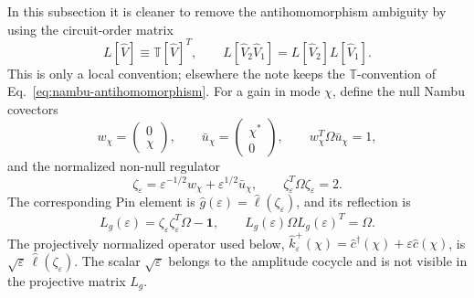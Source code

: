 \documentclass[aps,prb,onecolumn,nofootinbib,superscriptaddress]{revtex4-2}
\newcommand{\I}{\mathbf{1}}
\theoremstyle{plain}
\theoremstyle{definition}
\begin{document}
In this subsection it is cleaner to remove the antihomomorphism ambiguity by
using the circuit-order matrix
\begin{equation}
  L[\hat V]\equiv \mathbb T[\hat V]^T,
  \qquad
  L[\hat V_2\hat V_1]=L[\hat V_2]L[\hat V_1].
  \label{eq:circuit-order-L-convention}
\end{equation}
This is only a local convention; elsewhere the note keeps the
\(\mathbb T\)-convention of Eq.~\eqref{eq:nambu-antihomomorphism}.  For a
gain in mode \(\chi\), define the null Nambu covectors
\begin{equation}
  w_\chi=
  \begin{pmatrix}0\\ \chi\end{pmatrix},
  \qquad
  \bar u_\chi=
  \begin{pmatrix}\chi^*\\0\end{pmatrix},
  \qquad
  w_\chi^T\Omega \bar u_\chi=1,
  \label{eq:single-copy-null-gain-pair}
\end{equation}
and the normalized non-null regulator
\begin{equation}
  \zeta_\varepsilon
  =
  \varepsilon^{-1/2}w_\chi
  +
  \varepsilon^{1/2}\bar u_\chi,
  \qquad
  \zeta_\varepsilon^T\Omega\zeta_\varepsilon=2 .
  \label{eq:single-copy-gain-regulator-zeta}
\end{equation}
The corresponding Pin element is
\(\hat g(\varepsilon)=\hat\ell(\zeta_\varepsilon)\), and its reflection is
\begin{equation}
  L_g(\varepsilon)
  =
  \zeta_\varepsilon\zeta_\varepsilon^T\Omega-\I,
  \qquad
  L_g(\varepsilon)\Omega L_g(\varepsilon)^T=\Omega .
  \label{eq:L-reflection-form}
\end{equation}
The projectively normalized operator used below,
\(\hat k_\varepsilon^+(\chi)=\hat c^\dagger(\chi)+\varepsilon\hat c(\chi)\),
is \(\sqrt{\varepsilon}\,\hat\ell(\zeta_\varepsilon)\).  The scalar
\(\sqrt{\varepsilon}\) belongs to the amplitude cocycle and is not visible in
the projective matrix \(L_g\).
\end{document}
